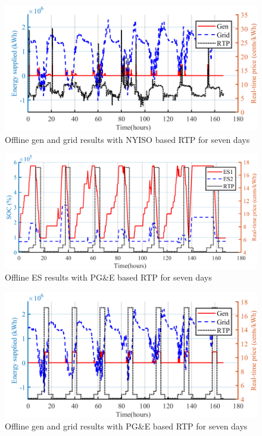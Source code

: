 \begin{figure}[!ht]
\centering
\includegraphics[width = \linewidth]{figs/A82/OFF_7_day_NYISO_GEN.png}
\caption{Offline gen and grid results with NYISO based RTP for seven days}
\label{fig:OFF_7_day_NYISO_GEN}
\end{figure}

\begin{figure}[!ht]
\centering
\includegraphics[width = \linewidth]{figs/A82/OFF_7_day_PGNE_ES.png}
\caption{Offline ES results with PG\&E based RTP for seven days}
\label{fig:OFF_7_day_PGNE_ES}
\end{figure}


\begin{figure}[!ht]
\centering
\includegraphics[width = \linewidth]{figs/A82/OFF_7_day_PGNE_GEN.png}
\caption{Offline gen and grid results with PG\&E based RTP for seven days}
\label{fig:OFF_7_day_PGNE_GEN}
\end{figure}

